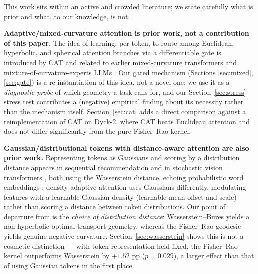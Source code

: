 \documentclass[11pt]{article}
\begin{document}
This work sits within an active and crowded literature; we state carefully what is prior and what, to our knowledge, is not.

\textbf{Adaptive/mixed-curvature attention is prior work, not a contribution of this paper.} The idea of learning, per token, to route among Euclidean, hyperbolic, and spherical attention branches via a differentiable gate is introduced by CAT \cite{lin2025cat} and related to earlier mixed-curvature transformers \cite{cho2023curve} and mixture-of-curvature-experts LLMs \cite{he2025helm}. Our gated mechanism (Sections \ref{sec:mixed}, \ref{sec:gate}) is a re-instantiation of this idea, not a novel one; we use it as a \emph{diagnostic probe} of which geometry a task calls for, and our Section~\ref{sec:stress} stress test contributes a (negative) empirical finding about its necessity rather than the mechanism itself. Section~\ref{sec:cat} adds a direct comparison against a reimplementation of CAT on Dyck-2, where CAT beats Euclidean attention and does not differ significantly from the pure Fisher--Rao kernel.

\textbf{Gaussian/distributional tokens with distance-aware attention are also prior work.} Representing tokens as Gaussians and scoring by a distribution distance appears in sequential recommendation \cite{fan2022stosa} and in stochastic vision transformers \cite{erick2023stochastic}, both using the Wasserstein distance, echoing probabilistic word embeddings \cite{vilnis2015}; density-adaptive attention \cite{ioannides2024daam} uses Gaussians differently, modulating features with a learnable Gaussian density (learnable mean offset and scale) rather than scoring a distance between token distributions. Our point of departure from \cite{erick2023stochastic} is the \emph{choice of distribution distance}: Wasserstein--Bures yields a non-hyperbolic optimal-transport geometry, whereas the Fisher--Rao geodesic yields genuine negative curvature. Section~\ref{sec:wasserstein} shows this is not a cosmetic distinction --- with token representation held fixed, the Fisher--Rao kernel outperforms Wasserstein by $+1.52$ pp ($p=0.029$), a larger effect than that of using Gaussian tokens in the first place.
\end{document}
